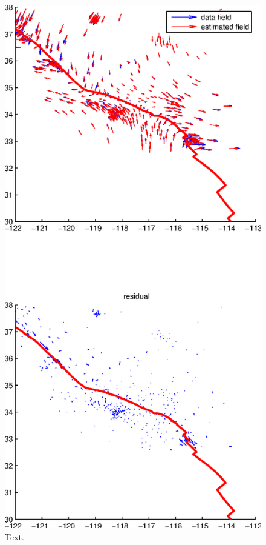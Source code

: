 \documentclass[11pt,titlepage,fleqn]{article}
\begin{document}
\begin{figure}
\includegraphics[width=12cm]{fig2D_B03.eps}
\caption[]
{{
Text.
\label{fig:2D_B03}
}}
\end{figure}
\end{document}
